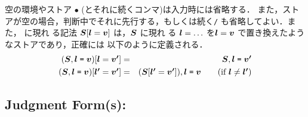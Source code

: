 \documentclass[11pt]{jarticle}
\begin{document}
空の環境やストア \(\bullet\) (とそれに続くコンマ)は入力時には省略する．
また，ストアが空の場合，判断中でそれに先行する，もしくは続く\texttt{/}
も省略してよい．また， に現れ
る記法 \(\EvalRefMLiiiMV{s}\relax[\EvalRefMLiiiMV{l} =
\EvalRefMLiiiMV{v}]\) は，\(\EvalRefMLiiiMV{s}\) に現れ
る \(\EvalRefMLiiiMV{l} = \ldots\) を\(\EvalRefMLiiiMV{l} =
\EvalRefMLiiiMV{v}\) で置き換えたようなストアであり，正確には
以下のように定義される．
\begin{eqnarray*}
  (\EvalRefMLiiiBlockTerm{\EvalRefMLiiiMV{s}}{
    \EvalRefMLiiiMV{l}}{\EvalRefMLiiiMV{v}})
      [\EvalRefMLiiiMV{l} = \EvalRefMLiiiMV{v}[']] & = &
      \EvalRefMLiiiBlockTerm{\EvalRefMLiiiMV{s}}{
    \EvalRefMLiiiMV{l}}{\EvalRefMLiiiMV{v}[']} \\
  (\EvalRefMLiiiBlockTerm{\EvalRefMLiiiMV{s}}{
    \EvalRefMLiiiMV{l}}{\EvalRefMLiiiMV{v}})
      [\EvalRefMLiiiMV{l}['] = \EvalRefMLiiiMV{v}[']] & = &
  \EvalRefMLiiiBlockTerm{
    (\EvalRefMLiiiMV{s}{}[\EvalRefMLiiiMV{l}['] = \EvalRefMLiiiMV{v}[']])
   }{\EvalRefMLiiiMV{l}}{\EvalRefMLiiiMV{v}} \qquad
   \mbox{(if \(\EvalRefMLiiiMV{l} \neq \EvalRefMLiiiMV{l}[']\))}
\end{eqnarray*}

\subsection*{Judgment Form(s):}
\end{document}
